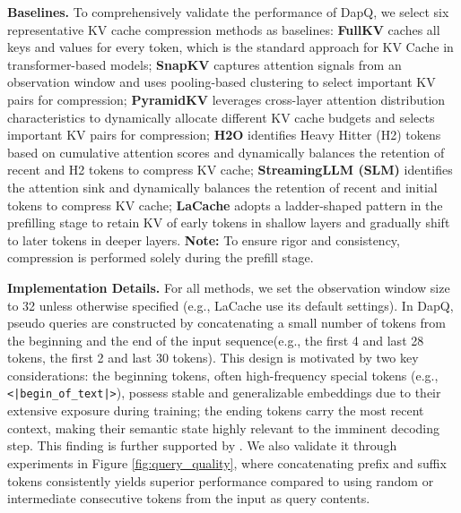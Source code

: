 \textbf{Baselines.}
To comprehensively validate the performance of DapQ, we select six representative KV cache compression methods as baselines: \textbf{FullKV} caches all keys and values for every token, which is the standard approach for KV Cache in transformer-based models; \textbf{SnapKV} \citep{snapkv} captures attention signals from an observation window and uses pooling-based clustering to select important KV pairs for compression; \textbf{PyramidKV} \citep{pyramidkv} leverages cross-layer attention distribution characteristics to dynamically allocate different KV cache budgets and selects important KV pairs for compression; \textbf{H2O} \citep{h2o} identifies Heavy Hitter (H2) tokens based on cumulative attention scores and dynamically balances the retention of recent and H2 tokens to compress KV cache; \textbf{StreamingLLM (SLM)} \citep{streamingllm} identifies the attention sink and dynamically balances the retention of recent and initial tokens to compress KV cache; \textbf{LaCache} \citep{lacache} adopts a ladder-shaped pattern in the prefilling stage to retain KV of early tokens in shallow layers and gradually shift to later tokens in deeper layers. \textbf{Note:} To ensure rigor and consistency, compression is performed solely during the prefill stage.



\textbf{Implementation Details.}
For all methods, we set the observation window size to 32 unless otherwise specified (e.g., LaCache use its default settings). In DapQ, pseudo queries are constructed by concatenating a small number of tokens from the beginning and the end of the input sequence(e.g., the first 4 and last 28 tokens, the first 2 and last 30 tokens). This design is motivated by two key considerations: the beginning tokens, often high-frequency special tokens (e.g.,\texttt{<|begin\_of\_text|>}), possess stable and generalizable embeddings due to their extensive exposure during training; the ending tokens carry the most recent context, making their semantic state highly relevant to the imminent decoding step. This finding is further supported by \citet{prefix_suffix}. We also validate it through experiments in Figure \ref{fig:query_quality}, where concatenating prefix and suffix tokens consistently yields superior performance compared to using random or intermediate consecutive tokens from the input as query contents.

